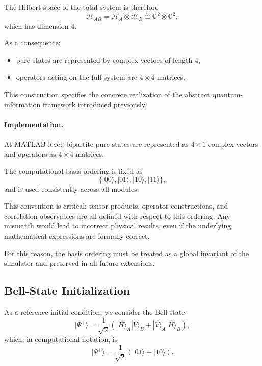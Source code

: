 \documentclass[a4paper]{article}
\begin{document}
The Hilbert space of the total system is therefore
\[
\mathcal{H}_{AB} = \mathcal{H}_A \otimes \mathcal{H}_B
\cong \mathbb{C}^2 \otimes \mathbb{C}^2,
\]
which has dimension \(4\).

As a consequence:
\begin{itemize}
    \item pure states are represented by complex vectors of length \(4\),
    \item operators acting on the full system are \(4 \times 4\) matrices.
\end{itemize}

This construction specifies the concrete realization of the abstract quantum-information framework introduced previously.

\paragraph{Implementation.}
At MATLAB level, bipartite pure states are represented as \(4 \times 1\) complex vectors and operators as \(4 \times 4\) matrices.

The computational basis ordering is fixed as
\[
\{|00\rangle,|01\rangle,|10\rangle,|11\rangle\},
\]
and is used consistently across all modules.

This convention is critical: tensor products, operator constructions, and correlation observables are all defined with respect to this ordering. Any mismatch would lead to incorrect physical results, even if the underlying mathematical expressions are formally correct.

For this reason, the basis ordering must be treated as a global invariant of the simulator and preserved in all future extensions.


\subsection{Bell-State Initialization}

As a reference initial condition, we consider the Bell state
\[
|\Psi^{+}\rangle
=
\frac{1}{\sqrt{2}}
\left(
|H\rangle_A |V\rangle_B
+
|V\rangle_A |H\rangle_B
\right),
\]
which, in computational notation, is
\[
|\Psi^{+}\rangle
=
\frac{1}{\sqrt{2}}
\left(
|01\rangle + |10\rangle
\right).
\]

\medskip
\end{document}
